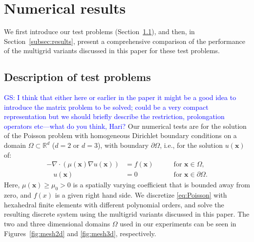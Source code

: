 \documentclass[smallcondensed,final]{svjour3}     %
\newcommand{\gsnote}[1]{\textcolor{blue}{GS: #1}}
\newcommand{\bs}[1]{\ensuremath{\boldsymbol #1}}
\begin{document}
\section{Numerical results}\label{sec:numerics}
We first introduce our test problems (Section~\ref{subsec:tests}), and
then, in Section~\ref{subsec:results}, present a comprehensive
comparison of the performance of the multigrid variants discussed
in this paper for these test problems.

\subsection{Description of test problems}\label{subsec:tests}
\gsnote{I think that either here or earlier in the paper it might be a
  good idea to introduce the matrix problem to be solved; could be a
  very compact representation but we should briefly describe the
  restriction, prolongation operators etc---what do you think, Hari?}
Our numerical tests are for the solution of the Poisson problem with
homogeneous Dirichlet boundary conditions on a domain
$\Omega\subset\mathbb R^d$ ($d=2$ or $d=3$), with boundary $\partial
\Omega$, i.e., for the solution $u(\bs x)$ of:
\begin{equation}\label{eq:Poisson}
  \begin{aligned}
    -\nabla\cdot\left(\mu(\bs x)\nabla u(\bs x)\right) &= f(\bs x) \quad &&\text{ for } \bs x\in \Omega,\\
    \quad u(\bs x)& = 0  \quad &&\text{ for } \bs x\in \partial\Omega.
  \end{aligned}
\end{equation}
Here, $\mu(\bs x)\ge \mu_0>0$ is a spatially varying coefficient that
is bounded away from zero, and $f(x)$ is a given right hand side. We
discretize \eqref{eq:Poisson} with hexahedral finite elements with
different polynomial orders, and solve the resulting discrete system
using the multigrid variants discussed in this paper. The two and
three dimensional domains $\Omega$ used in our experiments can be seen
in Figures~\ref{fig:mesh2d} and \ref{fig:mesh3d}, respectively.
%
\end{document}

